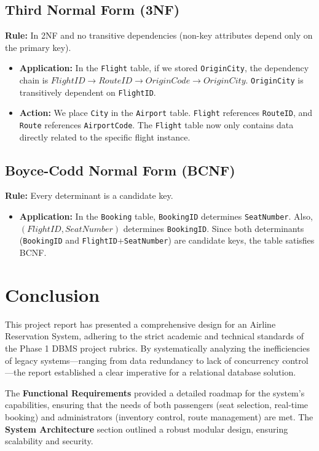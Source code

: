 \documentclass[12pt, a4paper]{article}
\begin{document}
	\subsection{Third Normal Form (3NF)}
	\textbf{Rule:} In 2NF and no transitive dependencies (non-key attributes depend only on the primary key).
	\begin{itemize}
		\item \textbf{Application:} In the \texttt{Flight} table, if we stored \texttt{OriginCity}, the dependency chain is $FlightID \rightarrow RouteID \rightarrow OriginCode \rightarrow OriginCity$. \texttt{OriginCity} is transitively dependent on \texttt{FlightID}.
		\item \textbf{Action:} We place \texttt{City} in the \texttt{Airport} table. \texttt{Flight} references \texttt{RouteID}, and \texttt{Route} references \texttt{AirportCode}. The \texttt{Flight} table now only contains data directly related to the specific flight instance.
	\end{itemize}
	
	\subsection{Boyce-Codd Normal Form (BCNF)}
	\textbf{Rule:} Every determinant is a candidate key.
	\begin{itemize}
		\item \textbf{Application:} In the \texttt{Booking} table, \texttt{BookingID} determines \texttt{SeatNumber}. Also, \\$(FlightID, SeatNumber)$ determines \texttt{BookingID}. Since both determinants (\texttt{BookingID} and \texttt{FlightID}+\texttt{SeatNumber}) are candidate keys, the table satisfies BCNF.
	\end{itemize}
	
	\newpage
	\section{Conclusion}
	
	This project report has presented a comprehensive design for an Airline Reservation System, adhering to the strict academic and technical standards of the Phase 1 DBMS project rubrics. By systematically analyzing the inefficiencies of legacy systems—ranging from data redundancy to lack of concurrency control—the report established a clear imperative for a relational database solution.
	
	The \textbf{Functional Requirements} provided a detailed roadmap for the system's capabilities, ensuring that the needs of both passengers (seat selection, real-time booking) and administrators (inventory control, route management) are met. The \textbf{System Architecture} section outlined a robust modular design, ensuring scalability and security.
	
\end{document}
